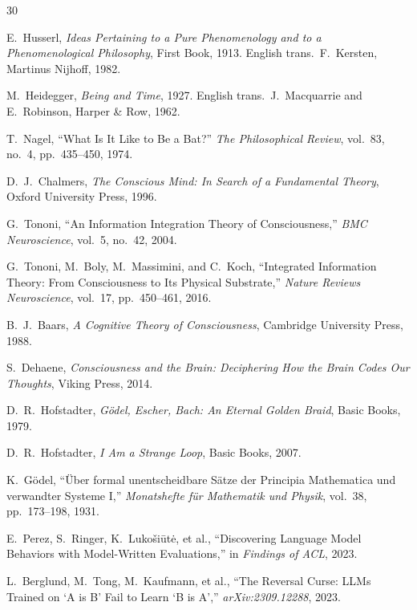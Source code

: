 \documentclass[12pt]{article}
\begin{document}
\begin{thebibliography}{30}

E.~Husserl, \emph{Ideas Pertaining to a Pure Phenomenology and to a Phenomenological Philosophy}, First Book, 1913. English trans.\ F.~Kersten, Martinus Nijhoff, 1982.

M.~Heidegger, \emph{Being and Time}, 1927. English trans.\ J.~Macquarrie and E.~Robinson, Harper \& Row, 1962.

T.~Nagel, ``What Is It Like to Be a Bat?'' \emph{The Philosophical Review}, vol.~83, no.~4, pp.~435--450, 1974.

D.~J.~Chalmers, \emph{The Conscious Mind: In Search of a Fundamental Theory}, Oxford University Press, 1996.

G.~Tononi, ``An Information Integration Theory of Consciousness,'' \emph{BMC Neuroscience}, vol.~5, no.~42, 2004.

G.~Tononi, M.~Boly, M.~Massimini, and C.~Koch, ``Integrated Information Theory: From Consciousness to Its Physical Substrate,'' \emph{Nature Reviews Neuroscience}, vol.~17, pp.~450--461, 2016.

B.~J.~Baars, \emph{A Cognitive Theory of Consciousness}, Cambridge University Press, 1988.

S.~Dehaene, \emph{Consciousness and the Brain: Deciphering How the Brain Codes Our Thoughts}, Viking Press, 2014.

D.~R.~Hofstadter, \emph{G\"odel, Escher, Bach: An Eternal Golden Braid}, Basic Books, 1979.

D.~R.~Hofstadter, \emph{I Am a Strange Loop}, Basic Books, 2007.

K.~G\"odel, ``\"Uber formal unentscheidbare S\"atze der Principia Mathematica und verwandter Systeme I,'' \emph{Monatshefte f\"ur Mathematik und Physik}, vol.~38, pp.~173--198, 1931.

E.~Perez, S.~Ringer, K.~Luko\v{s}i\={u}t\.{e}, et al., ``Discovering Language Model Behaviors with Model-Written Evaluations,'' in \emph{Findings of ACL}, 2023.

L.~Berglund, M.~Tong, M.~Kaufmann, et al., ``The Reversal Curse: LLMs Trained on `A is B' Fail to Learn `B is A','' \emph{arXiv:2309.12288}, 2023.


\end{thebibliography}
\end{document}
